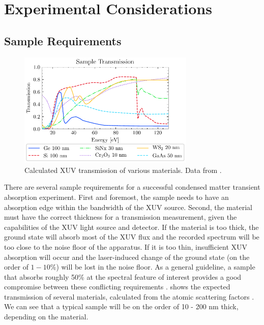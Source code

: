 \section{Experimental Considerations}
\label{sec:exp_considerations}

\subsection{Sample Requirements}

\begin{figure}
	\centering
	\includegraphics[width=0.75\textwidth]{figures/chap4/Sample_transmission_CXRO.pdf}
	\caption{Calculated XUV transmission of various materials. Data from \cite{gulliksonCXROXRayInteractions}.}
	\label{fig:Sample_trans_CXRO}
\end{figure}

There are several sample requirements for a successful condensed matter transient absorption experiment. First and foremost, the sample needs to have an absorption edge within the bandwidth of the XUV source. Second, the material must have the correct thickness for a transmission measurement, given the capabilities of the XUV light source and detector. If the material is too thick, the ground state will absorb most of the XUV flux and the recorded spectrum will be too close to the noise floor of the apparatus. If it is too thin, insufficient XUV absorption will occur and the laser-induced change of the ground state (on the order of $1-10\%$) will be lost in the noise floor. As a general guideline, a sample that absorbs roughly 50\% at the spectral feature of interest provides a good compromise between these conflicting requirements \cite{geneauxTransientAbsorptionSpectroscopy2019}.  shows the expected transmission of several materials, calculated from the atomic scattering factors \cite{gulliksonCXROXRayInteractions}. We can see that a typical sample will be on the order of 10 - 200 nm thick, depending on the material.

